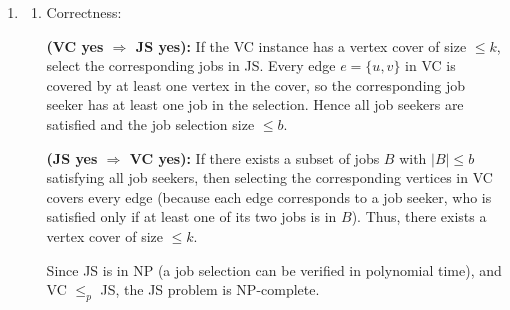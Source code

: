 \documentclass[12pt,a4paper]{article}
\makeatletter
\newtheorem*{solution}{Solution}
\theoremstyle{definition}
\renewenvironment{solution}[1][Solution] {\par\pushQED{\qed}\normalfont\topsep6\p@\@plus6\p@\relax\trivlist\item[\hskip\labelsep\bfseries#1\@addpunct{.}]\ignorespaces}{\popQED\endtrivlist\@endpefalse} \makeatother
\makeatother
\begin{document}
\begin{enumerate}
\begin{solution}
\begin{enumerate}
    \item Correctness:

    \textbf{(VC yes $\Rightarrow$ JS yes):} If the VC instance has a vertex cover of size \(\le k\), select the corresponding jobs in JS. Every edge \(e = \{u,v\}\) in VC is covered by at least one vertex in the cover, so the corresponding job seeker has at least one job in the selection. Hence all job seekers are satisfied and the job selection size \(\le b\).

    \textbf{(JS yes $\Rightarrow$ VC yes):} If there exists a subset of jobs \(B\) with \(|B| \le b\) satisfying all job seekers, then selecting the corresponding vertices in VC covers every edge (because each edge corresponds to a job seeker, who is satisfied only if at least one of its two jobs is in \(B\)). Thus, there exists a vertex cover of size \(\le k\).

    Since JS is in NP (a job selection can be verified in polynomial time), and VC \(\le_p\) JS, the JS problem is NP-complete.
\end{enumerate}

    \end{solution}
    
    
\end{enumerate}
\end{document}
